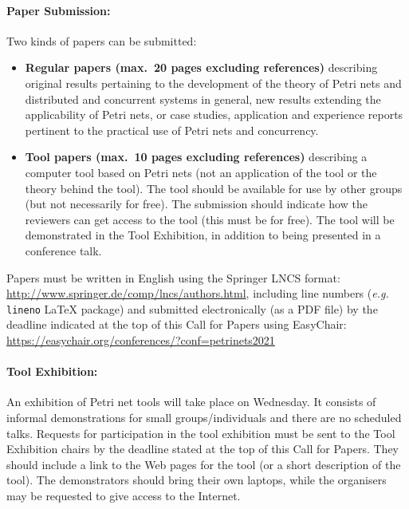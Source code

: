 \documentclass[10pt,a4paper]{article}
\begin{document}
\vspace*{-2em}
\paragraph*{Paper Submission:}\mbox{}

Two kinds of papers can be submitted:
\vspace*{-0.2cm}
\begin{itemize}
\item {\bf Regular papers (max.\ 20 pages excluding references)} describing original results pertaining
to the development of the theory of Petri nets and distributed and concurrent systems in
general, new results extending the applicability of Petri nets, or case studies, application
and experience reports pertinent to the practical use of Petri nets and concurrency.
\item {\bf Tool papers (max.\ 10 pages excluding references)} describing a computer tool based on Petri
nets (not an application of the tool or the theory behind the tool). The tool should
be available for use by other groups (but not necessarily for free). The submission
should indicate how the reviewers can get access to the tool (this must be for free).
The tool will be demonstrated in the Tool Exhibition, in addition to being presented
in a conference talk.
\end{itemize}

\vspace*{-0.2cm}
\noindent Papers must be written in English using the Springer LNCS format: \url{http://www.springer.de/comp/lncs/authors.html},
including line numbers (\emph{e.g.} \texttt{lineno} \LaTeX{} package)
and submitted electronically (as a PDF file) by the deadline indicated at the top
of this Call for Papers using EasyChair:
% 
	\url{https://easychair.org/conferences/?conf=petrinets2021}

\vspace*{-0.5em}
\paragraph*{Tool Exhibition:}\mbox{}

An exhibition of Petri net tools will take place on Wednesday. It consists of informal
demonstrations for small groups/individuals and there are no scheduled talks. Requests
for participation in the tool exhibition must be sent to the Tool Exhibition chairs
by the deadline stated at the top of this Call for Papers. They should include a link
to the Web pages for the tool (or a short description of the tool). The demonstrators
should bring their own laptops, while the organisers may be requested to give access
to the Internet.
\end{document}
